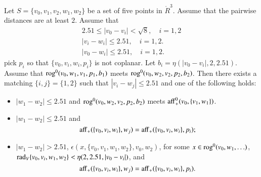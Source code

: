 \begin{lemma}
Let $S=\{v_0,v_1,v_2,w_1,w_2\}$ be a set of five points in $\ring{R}^3$.
Assume that the pairwise distances are at least $2$.  Assume
that
  $$\begin{array}{lll}
  2.51 \le |v_0-v_i| < \sqrt8,\quad i=1,2\\
  |v_i-w_i|\le 2.51, \quad i=1,2.\\
  |v_0-w_i|\le 2.51,\quad i=1,2.
  \end{array}
  $$
pick $p_i$ so that $\{v_0,v_i,w_i,p_i\}$ is not coplanar.
Let $b_i=\eta(|v_0-v_i|,2,2.51)$.  
%
Assume that ${\operatorname{rog}}^0(v_0,w_1,v_1,p_1,b_1)$ meets
  ${\operatorname{rog}}^0(v_0,w_2,v_2,p_2,b_2)$.
Then there exists a matching $\{i,j\}=\{1,2\}$ 
such that $|v_i-w_j|\le 2.51$ and one of the following holds:
\begin{itemize}
     \item $|w_1-w_2|\le 2.51$ and ${\operatorname{rog}}^0(v_0,w_2,v_2,p_2,b_2)$ meets
           ${\operatorname{aff}}_+^0(v_0,\{v_1,w_1\})$.
       \item $|w_1-w_2|\le 2.51$ and 
     $$
     {\operatorname{aff}}_+(\{v_0,v_i,w_i\},w_j) = {\operatorname{aff}}_+(\{v_0,v_i,w_i\},p_i);
     $$
              \item $|w_1-w_2|> 2.51$, $\epsilon(x,\{v_0,v_1,w_1,w_2\},v_0,w_2)$,
                for some $x\in {\operatorname{rog}}^0(v_0,w_1,\ldots)$, 
             $\operatorname{rad}_V\{v_0,v_i,w_1,w_2\}<\eta(2,2.51,|v_0-v_i|)$, and
    $$
     {\operatorname{aff}}_+(\{v_0,v_i,w_i\},w_j) = {\operatorname{aff}}_+(\{v_0,v_i,w_i\},p_i).
     $$
\end{itemize}
\end{lemma}

